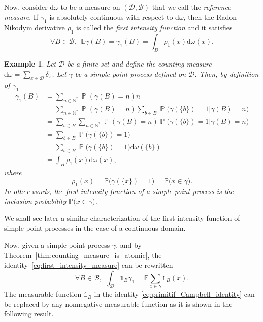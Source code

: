 \documentclass[twoside,11pt]{book}
\newtheorem{example}{Example}
\numberwithin{theorem}{chapter}
\numberwithin{definition}{chapter}
\numberwithin{proposition}{chapter}
\numberwithin{corollary}{chapter}
\numberwithin{example}{chapter}
\numberwithin{lemma}{chapter}
\numberwithin{assumption}{chapter}
\DeclareMathOperator{\Prb}{\mathbb{P}}
\begin{document}
Now, consider $\mathrm{d}\omega$ to be a measure on $(\mathcal{D},\mathcal{B})$ that we call the \emph{reference measure}. If $\gamma_{1}$ is absolutely continuous with respect to $\mathrm{d}\omega$, then the Radon Nikodym derivative $\rho_{1}$ is called the \emph{first intensity function} and it satisfies
\begin{equation}\label{eq:first_intensity_function}
\forall B \in \mathcal{B}, \:\:\mathbb{E} \gamma(B) = \gamma_1(B) = \int_{B} \rho_{1}(x) \mathrm{d}\omega(x). 
\end{equation}

\begin{example}\label{ex:rho_1_inclustion_probability_discret_set}
Let $\mathcal{D}$ be a finite set and define the counting measure $\mathrm{d}\omega = \sum\limits_{x \in \mathcal{D}} \delta_x$. Let $\gamma$ be a simple point process defined on $\mathcal{D}$. Then, by definition of $\gamma_{1}$
\begin{align}
\gamma_1(B) & = \sum\limits_{n \in \mathbb{N}^{*}} \Prb(\gamma(B) = n) n\\
& = \sum\limits_{n \in \mathbb{N}^{*}} \Prb(\gamma(B) = n) \sum\limits_{b \in B} \Prb \big( \gamma(\{b\}) = 1| \gamma(B) = n \big) \nonumber\\
& = \sum\limits_{b \in B} \sum\limits_{n \in \mathbb{N}^{*}} \Prb(\gamma(B) = n)  \Prb \big( \gamma(\{b\}) = 1| \gamma(B) = n \big) \nonumber\\
& = \sum\limits_{b \in B}  \Prb \big( \gamma(\{b\}) = 1\big) \nonumber\\
& = \sum\limits_{b \in B}  \Prb \big( \gamma(\{b\}) = 1\big) \mathrm{d}\omega(\{b\}) \nonumber\\
& = \int_{B} \rho_{1}(x) \mathrm{d}\omega(x), \nonumber
\end{align}
where 
\begin{equation}
\rho_{1}(x) = \mathbb{P} \big(\gamma(\{x\}) = 1 \big) = \mathbb{P} \big( x \in \gamma \big) .
\end{equation}
In other words, the first intensity function of a simple point process is the inclusion probability $\mathbb{P} \big(x \in \gamma \big)$.
\end{example}
We shall see later a similar characterization of the first intensity function of simple point processes in the case of a continuous domain.

Now, given a simple point process $\gamma$, and by Theorem~\ref{thm:counting_measure_is_atomic}, the identity~\eqref{eq:first_intensity_measure} can be rewritten
\begin{equation}\label{eq:primitif_Campbell_identity}
\forall B \in \mathcal{B}, \:\:\int_{\mathcal{D}} \mathbb{1}_{B} \gamma_1 = \mathbb{E}\sum\limits_{x \in \gamma} \mathbb{1}_{B}(x).
\end{equation}
The measurable function $\mathbb{1}_{B}$ in the identity \eqref{eq:primitif_Campbell_identity} can be replaced by any nonnegative measurable function as it is shown in the following result.
\end{document}

